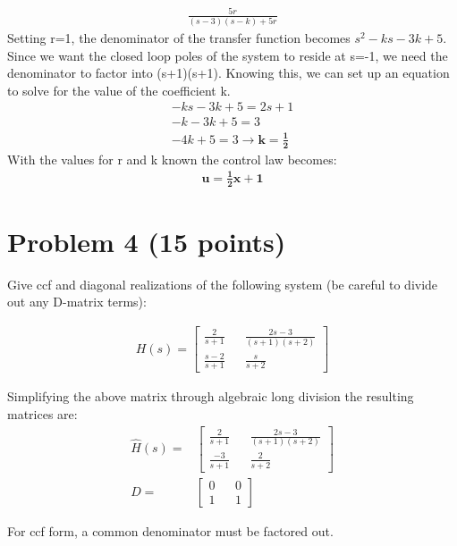 \documentclass[paper=a4,margin, fontsize=11pt]{scrartcl} %
\numberwithin{equation}{section} %
\numberwithin{figure}{section} %
\numberwithin{table}{section} %
\begin{document}
\begin{align*}
\frac{5r}{(s-3)(s-k)+5r}
\end{align*}
Setting r=1, the denominator of the transfer function becomes
$s^2-ks-3k+5$. Since we want the closed loop poles of the system to reside at s=-1, we need the denominator to factor into (s+1)(s+1).  Knowing this, we can set up an equation to solve for the value of the coefficient k.
\begin{align*}
-ks-3k+5=2s+1\\
-k-3k+5=3\\
-4k+5=3 \rightarrow \boldsymbol{k=\frac{1}{2}}
\end{align*}
With the values for r and k known the control law becomes:
\begin{align*}
\boldsymbol{u=\frac{1}{2}x+1}
\end{align*}
\section*{Problem 4 (15 points)}
Give ccf and diagonal realizations of the following system (be careful to divide out any D-matrix terms):

\begin{align*}
H(s)=\begin{bmatrix}\frac{2}{s+1} && \frac{2s-3}{(s+1)(s+2)}\\\frac{s-2}{s+1} && \frac{s}{s+2}\end{bmatrix}
\end{align*}

Simplifying the above matrix through algebraic long division the resulting matrices are:\\

\begin{align*}
\hat{H}(s)=&\begin{bmatrix}
\frac{2}{s+1} && \frac{2s-3}{(s+1)(s+2)} \\ \frac{-3}{s+1} && \frac{2}{s+2}\end{bmatrix}\\
D=&\begin{bmatrix} 0 && 0 \\ 1 && 1 \end{bmatrix}
\end{align*}

For ccf form, a common denominator must be factored out.\\
\end{document}
